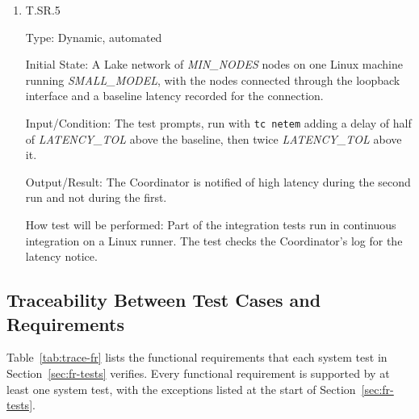 \documentclass[12pt, titlepage]{article}
\begin{document}
\begin{enumerate}
\item{T.SR.5\\}
\label{T.SR.5}

Type: Dynamic, automated

Initial State: A Lake network of \textit{MIN\_NODES} nodes on one Linux machine running
\textit{SMALL\_MODEL}, with the nodes connected through the loopback interface
and a baseline latency recorded for the connection.

Input/Condition: The test prompts, run with \texttt{tc netem} adding a delay of
half of \textit{LATENCY\_TOL} above the baseline, then twice
\textit{LATENCY\_TOL} above it.

Output/Result: The Coordinator is notified of high latency during the second
run and not during the first.

How test will be performed: Part of the integration tests run in continuous
integration on a Linux runner. The test checks the Coordinator's log for the latency
notice.

\end{enumerate}
\endgroup

\subsection{Traceability Between Test Cases and Requirements}

Table~\ref{tab:trace-fr} lists the functional requirements that each system test in
Section~\ref{sec:fr-tests} verifies. Every functional requirement is supported by at least one
system test, with the exceptions listed at the start of Section~\ref{sec:fr-tests}.
\end{document}
